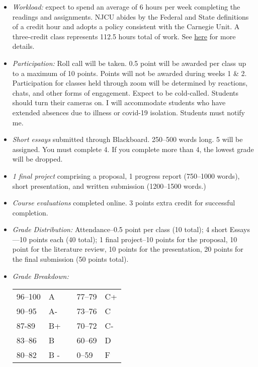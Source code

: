 \documentclass[article,oneside]{memoir}
\begin{document}
\begin{itemize}


\item \textit{Workload:} expect to spend an average of 6 hours per week completing the readings and assignments. NJCU abides by the Federal and State definitions of a credit hour and adopts a policy consistent with the Carnegie Unit. A three-credit class represents 112.5 hours total of work. See \href{http://scottoconnor.org/resources/Credit.pdf}{here} for more details.

\item \textit{Participation:} Roll call will be taken. 0.5 point will be awarded per class up to a maximum of 10 points. Points will not be awarded during weeks 1 \& 2. Participation for classes held through zoom will be determined by reactions, chats, and other forms of engagement. Expect to be cold-called. Students should turn their cameras on. I will accommodate students who have extended absences due to illness or covid-19 isolation. Students must notify me. 


\item \textit{Short essays} submitted through Blackboard. 250--500 words long. 5 will be assigned. You must complete 4. If you complete more than 4, the lowest grade will be dropped.
 
\item \textit{1 final project} comprising a proposal, 1 progress report (750--1000 words), short presentation, and written submission (1200--1500 words.)

\item \textit{Course evaluations} completed online. 3 points extra credit for successful completion.


\item \textit{Grade Distribution:} Attendance--0.5 point per class (10 total); 4 short Essays---10 points each (40 total); 1 final project--10 points for the proposal, 10 point for the literature review, 10 points for the presentation, 20 points for the final submission (50 points total).










\item \textit{Grade Breakdown:}

 \begin{tabular}{ | l | l | p{2cm} | l | l | }
    \hline 
96--100 & A  & &  77--79 &  C+ \\  
90--95 & A- & &  73--76 & C \\
87-89 & B+ &  &  70--72 & C- \\ 
83--86 & B  & &  60--69 & D\\
80--82 & B - & & 0--59 & F\\ \hline
    \end{tabular}


\end{itemize}
\end{document}
